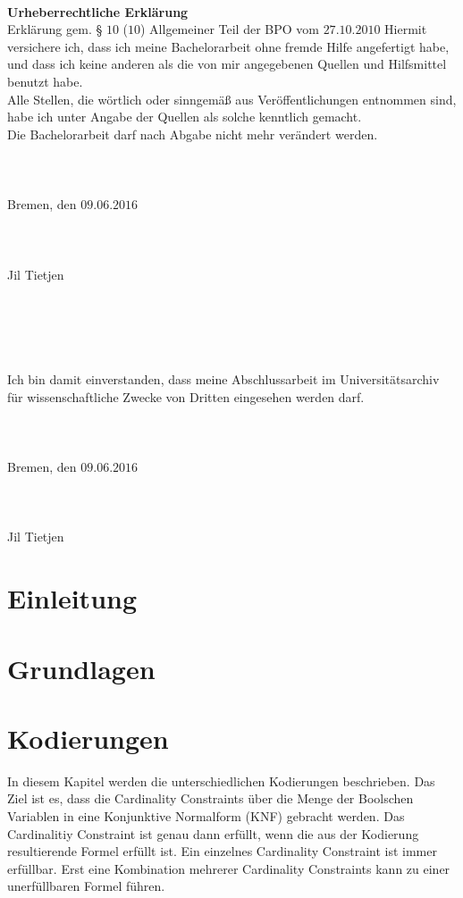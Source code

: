 \documentclass[a4,abstract=on]{scrartcl}
\newcommand*\stdsection{}
\let\stdsection\section
\renewcommand*\section{%
    \clearpage\ifodd\value{page}\else\mbox{}\clearpage\fi
    \stdsection}
\begin{document}
	\newpage
~\\
\textbf{Urheberrechtliche Erklärung}\\
Erklärung gem. § $10$ ($10$) Allgemeiner Teil der BPO vom $27$.$10$.$2010$
Hiermit versichere ich, dass ich meine Bachelorarbeit ohne fremde Hilfe angefertigt habe, und dass ich keine anderen als die von mir angegebenen Quellen und Hilfsmittel benutzt habe.\\
Alle Stellen, die wörtlich oder sinngemäß aus Veröffentlichungen entnommen sind, habe ich unter Angabe der Quellen als solche kenntlich gemacht.\\
Die Bachelorarbeit darf nach Abgabe nicht mehr verändert werden.\\
~\\~\\~\\
Bremen, den $09$.$06$.$2016$\\
~\\~\\~\\
Jil Tietjen
~\\~\\~\\~\\~\\~\\
Ich bin damit einverstanden, dass meine Abschlussarbeit im Universitätsarchiv für wissenschaftliche Zwecke von Dritten eingesehen werden darf.\\
~\\~\\~\\
Bremen, den $09$.$06$.$2016$\\
~\\~\\~\\
Jil Tietjen
\clearpage

	\tableofcontents
	\clearpage

\section{Einleitung}
\section{Grundlagen}
\section{Kodierungen}
In diesem Kapitel werden die unterschiedlichen Kodierungen beschrieben. Das Ziel ist es, dass die Cardinality Constraints über die Menge der Boolschen Variablen in eine Konjunktive Normalform (KNF) gebracht werden. %
Das Cardinalitiy Constraint ist genau dann erfüllt, wenn die aus der Kodierung resultierende Formel erfüllt ist. Ein einzelnes Cardinality Constraint ist immer erfüllbar. Erst eine Kombination mehrerer Cardinality Constraints kann zu einer unerfüllbaren Formel führen.
\end{document}
